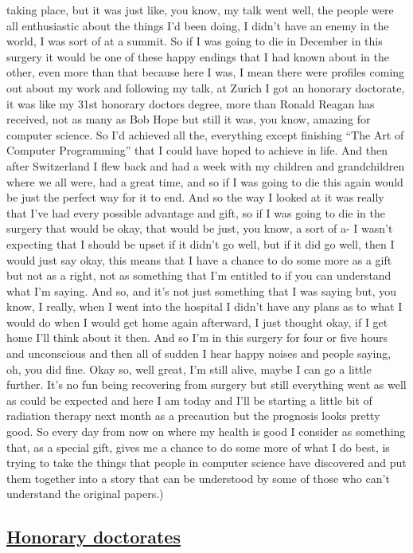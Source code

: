 \documentclass[]{article}
\begin{document}
taking place, but it was just like, you know, my talk went well, the
people were all enthusiastic about the things I'd been doing, I didn't
have an enemy in the world, I was sort of at a summit. So if I was going
to die in December in this surgery it would be one of these happy
endings that I had known about in the other, even more than that because
here I was, I mean there were profiles coming out about my work and
following my talk, at Zurich I got an honorary doctorate, it was like my
31st honorary doctors degree, more than Ronald Reagan has received, not
as many as Bob Hope but still it was, you know, amazing for computer
science. So I'd achieved all the, everything except finishing ``The Art
of Computer Programming'' that I could have hoped to achieve in life.
And then after Switzerland I flew back and had a week with my children
and grandchildren where we all were, had a great time, and so if I was
going to die this again would be just the perfect way for it to end. And
so the way I looked at it was really that I've had every possible
advantage and gift, so if I was going to die in the surgery that would
be okay, that would be just, you know, a sort of a- I wasn't expecting
that I should be upset if it didn't go well, but if it did go well, then
I would just say okay, this means that I have a chance to do some more
as a gift but not as a right, not as something that I'm entitled to if
you can understand what I'm saying. And so, and it's not just something
that I was saying but, you know, I really, when I went into the hospital
I didn't have any plans as to what I would do when I would get home
again afterward, I just thought okay, if I get home I'll think about it
then. And so I'm in this surgery for four or five hours and unconscious
and then all of sudden I hear happy noises and people saying, oh, you
did fine. Okay so, well great, I'm still alive, maybe I can go a little
further. It's no fun being recovering from surgery but still everything
went as well as could be expected and here I am today and I'll be
starting a little bit of radiation therapy next month as a precaution
but the prognosis looks pretty good. So every day from now on where my
health is good I consider as something that, as a special gift, gives me
a chance to do some more of what I do best, is trying to take the things
that people in computer science have discovered and put them together
into a story that can be understood by some of those who can't
understand the original papers.)

\subsection{\texorpdfstring{\href{http://webofstories.com/play/17145}{Honorary
doctorates}}{Honorary doctorates}}\label{honorary-doctorates}
\end{document}
